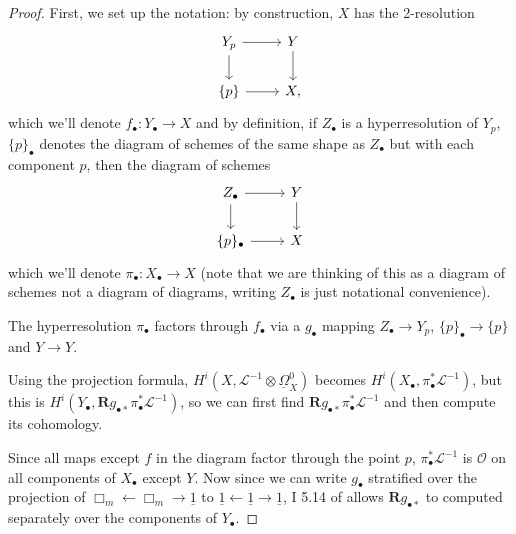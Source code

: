 \documentclass{report}
\theoremstyle{definition}
\newcommand{\LL}{\mathcal{L}}
\newcommand{\OO}{\mathcal{O}}
\newcommand{\bR}{\textbf{R}}
\newcommand{\DB}{\underline{\Omega}}
\begin{document}
\begin{proof}
	First, we set up the notation: by construction, $X$ has the 2-resolution
	\[
	\begin{tikzcd}
	Y_p \ar{r} \ar{d} & Y \ar{d} \\
	\{p\} \ar{r} & X,
	\end{tikzcd}\]
	which we'll denote $f_\bullet : Y_\bullet \rightarrow X$
	and by definition, if $Z_\bullet$ is a hyperresolution of $Y_p$, $\{p\}_\bullet$ denotes the diagram of schemes of the same shape as $Z_\bullet$ but with each component $p$, then the diagram of schemes
	\[
	\begin{tikzcd}
	Z_\bullet \ar{r} \ar{d} & Y \ar{d} \\
	\{p\}_\bullet \ar{r} & X
	\end{tikzcd}\]
	which we'll denote $\pi_\bullet : X_\bullet \rightarrow X$ (note that we are thinking of this as a diagram of schemes not a diagram of diagrams, writing $Z_\bullet$ is just notational convenience).
		
	The hyperresolution $\pi_\bullet$ factors through $f_\bullet$ via a $g_\bullet$ mapping $Z_\bullet \rightarrow Y_p$, $\{p\}_\bullet \rightarrow \{p\}$ and $Y \rightarrow Y$.
		
	Using the projection formula, $H^i(X, \LL^{-1} \otimes \DB_{X}^0)$ becomes $H^i(X_\bullet, \pi_\bullet^* \LL^{-1})$, but this is $H^i(Y_\bullet, \bR g_{\bullet *} \pi_\bullet^* \LL^{-1})$, so we can first find $\bR g_{\bullet *} \pi_\bullet^* \LL^{-1}$ and then compute its cohomology.
		
	Since all maps except $f$ in the diagram factor through the point $p$, $\pi_\bullet^* \LL^{-1}$ is $\OO$ on all components of $X_\bullet$ except $Y$.
	Now since we can write $g_\bullet$ stratified over the projection of $\Box_m \leftarrow \Box_m \rightarrow \underline{1}$ to $\underline{1} \leftarrow \underline{1} \rightarrow \underline{1}$, I 5.14 of \cite{Guillen1988} allows $\bR g_{\bullet *}$ to computed separately over the components of $Y_\bullet$.
		

\end{proof}
\end{document}
